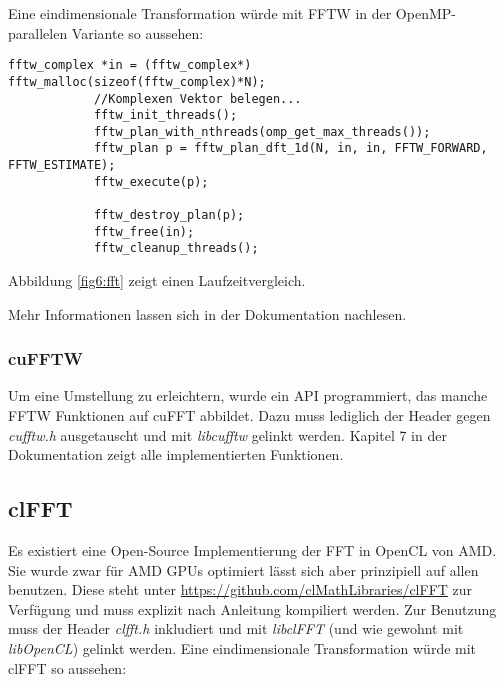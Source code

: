 		 	Eine eindimensionale Transformation würde mit FFTW in der OpenMP-parallelen Variante so aussehen:
		 	\begin{lstlisting}[caption=FFTW Beispiel] 
		 	fftw_complex *in = (fftw_complex*) fftw_malloc(sizeof(fftw_complex)*N);
		 	//Komplexen Vektor belegen...
			fftw_init_threads();
			fftw_plan_with_nthreads(omp_get_max_threads());	
			fftw_plan p = fftw_plan_dft_1d(N, in, in, FFTW_FORWARD, FFTW_ESTIMATE); 
			fftw_execute(p); 
			
			fftw_destroy_plan(p);
			fftw_free(in);
			fftw_cleanup_threads();	 	
		 	\end{lstlisting}
		 	
			Abbildung \ref{fig6:fft} zeigt einen Laufzeitvergleich.
		
			Mehr Informationen lassen sich in der Dokumentation nachlesen. \autocite{fftwDoc}
			
			\subsubsection{cuFFTW}
			Um eine Umstellung zu erleichtern, wurde ein \Gls{API} programmiert, das manche FFTW Funktionen auf cuFFT abbildet. Dazu muss lediglich der Header gegen \textit{cufftw.h} ausgetauscht und mit \textit{libcufftw} gelinkt werden. Kapitel 7 in der Dokumentation zeigt alle implementierten Funktionen. \autocite{cufftDoc}		
			
		\subsection{clFFT}
		Es existiert eine Open-Source Implementierung der FFT in OpenCL von AMD. Sie wurde zwar für AMD GPUs optimiert lässt sich aber prinzipiell auf allen benutzen. Diese steht unter \url{https://github.com/clMathLibraries/clFFT} zur Verfügung und muss explizit nach Anleitung kompiliert werden. Zur Benutzung muss der Header \textit{clfft.h} inkludiert und mit \textit{libclFFT} (und wie gewohnt mit \textit{libOpenCL}) gelinkt werden. Eine eindimensionale Transformation würde mit clFFT so aussehen:
		
